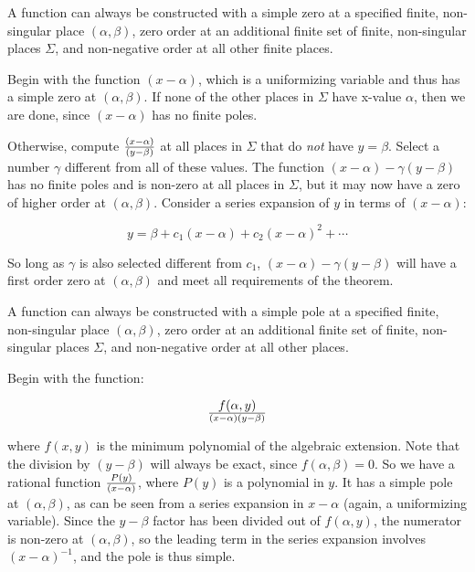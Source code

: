 \endtheorem

\theorem
\label{simple zero construction}

A function can always be constructed with a simple zero at a specified
finite, non-singular place $(\alpha, \beta)$, zero order at an
additional finite set of finite, non-singular places $\Sigma$, and
non-negative order at all other finite places.

\proof

Begin with the function $(x-\alpha)$, which is a uniformizing variable
and thus has a simple zero at $(\alpha, \beta)$.  If none of the other
places in $\Sigma$ have x-value $\alpha$, then we are done, since
$(x-\alpha)$ has no finite poles.

Otherwise, compute $(x-\alpha)\over(y-\beta)$ at all places in
$\Sigma$ that do {\it not} have $y = \beta$.  Select a number
$\gamma$ different from all of these values.  The function $(x-\alpha)
- \gamma (y-\beta)$ has no finite poles and
is non-zero at all places in $\Sigma$, but it may now have a zero of
higher order at $(\alpha, \beta)$.  Consider a series expansion
of $y$ in terms of $(x-\alpha)$:

$$y = \beta + c_1 (x-\alpha) + c_2 (x-\alpha)^2 + \cdots$$

So long as $\gamma$ is also selected different from $c_1$, $(x-\alpha)
- \gamma (y-\beta)$ will have a first order zero at $(\alpha, \beta)$
and meet all requirements of the theorem.


\endtheorem

\vfill\eject

\theorem
\label{simple pole construction}

A function can always be constructed with a simple pole at a specified
finite, non-singular place $(\alpha, \beta)$, zero order at an
additional finite set of finite, non-singular places $\Sigma$, and
non-negative order at all other places.

\proof

Begin with the function:

$$f(\alpha,y)\over(x-\alpha)(y-\beta)$$

where $f(x,y)$ is the minimum polynomial of the algebraic extension.
Note that the division by $(y-\beta)$ will always be exact, since
$f(\alpha, \beta)=0$.  So we have a rational function
$P(y)\over(x-\alpha)$, where $P(y)$ is a polynomial in $y$.  It has a
simple pole at $(\alpha, \beta)$, as can be seen from a series
expansion in $x-\alpha$ (again, a uniformizing variable).  Since the
$y-\beta$ factor has been divided out of $f(\alpha,y)$, the numerator
is non-zero at $(\alpha, \beta)$, so the leading term in the series
expansion involves $(x-\alpha)^{-1}$, and the pole is thus simple.

